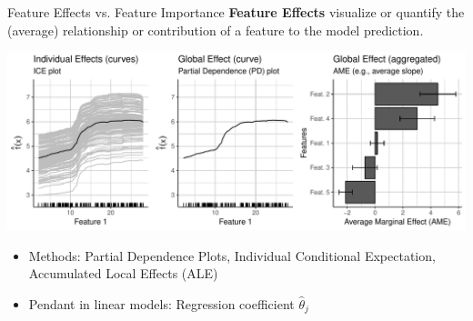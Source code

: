 \documentclass[11pt,compress,t,notes=noshow, xcolor=table]{beamer}
\begin{document}
\begin{vbframe}{Feature Effects vs. Feature Importance}
\textbf{Feature Effects} visualize or quantify the (average) relationship or contribution of a feature to the model prediction.
\begin{center}
\includegraphics[page=1, width=\textwidth]{figure_man/feature-effects}
\end{center}
  \begin{itemize}
    \item Methods: Partial Dependence Plots, Individual Conditional Expectation, Accumulated Local Effects (ALE)
    \item Pendant in linear models: Regression coefficient $\hat{\theta}_j$
  \end{itemize}
\framebreak


\end{vbframe}
\end{document}

